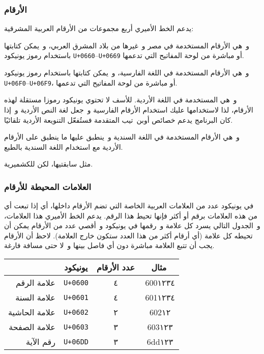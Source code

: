 \documentclass[a4paper]{article}
\newcommand  \F[1]{\addfontfeature{RawFeature={#1}}}    %
\renewcommand\L[1]{\F{language=#1}}                     %
\renewcommand\U[1]{\colorbox{codecolor}{\texttt{U+#1}}} %
\begin{document}
\subsubsection{الأرقام}
يدعم الخط الأميري أربع مجموعات من الأرقام العربية المشرقية:

\begin{description}[style=nextline,font=\mdseries\F{-pnum}]
\item[\L{ARA}٠١٢٣٤٥٦٧٨٩]
	و هي الأرقام المستخدمة في مصر و غيرها من بلاد المشرق العربي، و يمكن
	كتابتها باستخدام رموز يونيكود \U{0660}–\U{0669} أو
	مباشرة من لوحة المفاتيح التي تدعمها.

\item[\L{FAR}۰۱۲۳۴۵۶۷۸۹]
	و هي الأرقام المستخدمة في اللغة الفارسية، و يمكن كتابتها باستخدام
	رموز يونيكود \U{06F0}–\U{06F9}، أو مباشرة من لوحة
	المفاتيح التي تدعمها.

\item[\L{URD}۰۱۲۳۴۵۶۷۸۹]
	و هي المستخدمة في اللغة الأردية. للأسف لا تحتوي يونيكود رموزا مستقلة
	لهذه الأرقام، لذا لاستخدامها عليك استخدام الأرقام الفارسية و جعل لغة
	النص الأردية و إذا كان البرنامج يدعم خصائص أوبن تيب المتقدمة فستُفعّل
	التنويعة الأردية تلقائيًا.

\item[\L{SND}۰۱۲۳۴۵۶۷۸۹]
	و هي الأرقام المستخدمة في اللغة السندية و ينطبق عليها ما ينطبق على
	الأرقام الأردية مع استخدام اللغة السندية بالطبع.

\item[\L{KSH}۰۱۲۳۴۵۶۷۸۹]
	مثل سابقتيها، لكن للكشميرية.
\end{description}

\subsubsection{العلامات المحيطة للأرقام}
في يونيكود عدد من العلامات العربية الخاصة التي تضم الأرقام داخلها، أي
إذا تبعت أي من هذه العلامات برقم أو أكثر فإنها تحيط هذا الرقم. يدعم الخط
الأميري هذا العلامات، و الجدول التالي يسرد كل علامة و رقمها في يونيكود
و أقصي عدد من الأرقام يمكن أن تحيطه كل علامة (أي أرقام أكثر من هذا العدد
ستكون خارج العلامة). لاحظ أن الأرقام يجب أن تتبع العلامة مباشرة دون أي
فاصل بينها و لا حتى مسافة فارغة.

\begin{center}
  \begin{tabular}{r c c c}
    \hline
                  & يونيكود & عدد الأرقام & مثال     \\
    \hline
    علامة الرقم   & \U{0600} & ٤ & ^^^600١٢٣٤ \\
    علامة السنة   & \U{0601} & ٤ & ^^^601١٢٣٤ \\
    علامة الحاشية & \U{0602} & ٢ & ^^^602١٢   \\
    علامة الصفحة  & \U{0603} & ٣ & ^^^603١٢٣  \\
    رقم الآية     & \U{06DD} & ٣ & ^^^6dd١٢٣  \\
    \hline
  \end{tabular}
\end{center}
\end{document}
